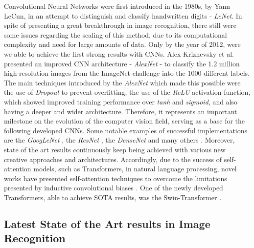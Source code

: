 \documentclass{article}
\begin{document}
Convolutional Neural Networks were first introduced in the 1980s, by Yann LeCun, in an attempt to distinguish and classify handwritten digits - \textit{LeNet}. In spite of presenting a great breakthrough in image recognition, there still were some issues regarding the scaling of this method, due to its computational complexity and need for large amounts of data. Only by the year of 2012, were we able to achieve the first strong results with CNNs. Alex Krizhevsky et al. \cite{krizhevsky2012imagenet} presented an improved CNN architecture - \textit{AlexNet} - to classify the 1.2 million high-resolution images from the ImageNet challenge into the 1000 different labels. The main techniques introduced by the \textit{AlexNet} which made this possible were the use of \textit{Dropout} to prevent overfitting, the use of the \textit{ReLU} activation function, which showed improved training performance over \textit{tanh} and \textit{sigmoid}, and also having a deeper and wider architecture. Therefore, it represents an important milestone on the evolution of the computer vision field, serving as a base for the following developed CNNs. Some notable examples of successful implementations are the \textit{GoogLeNet} \cite{Szegedy_2015_CVPR}, the \textit{ResNet} \cite{He_2016_CVPR}, the \textit{DenseNet} \cite{Huang_2017_CVPR} and many others \cite{Hu_2018_CVPR, Huang_2018_CVPR, efficientnet, Li_2019_CVPR}. Moreover, state of the art results continuously keep being achieved with various new creative approaches and architectures. Accordingly, due to the success of self-attention models, such as Transformers, in natural language processing, novel works have presented self-attention techniques to overcome the limitations presented by inductive convolutional biases \cite{dosovitskiy2021image, zhu2021deformable}. One of the newly developed Transformers, able to achieve SOTA results, was the Swin-Transformer \cite{2021swin}.

\subsection{Latest State of the Art results in Image Recognition}
\end{document}
